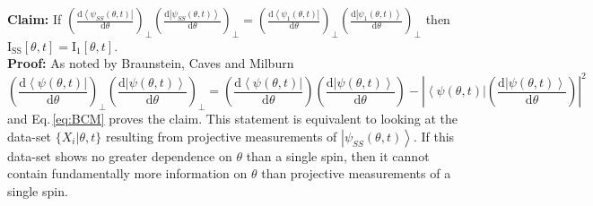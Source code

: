 \documentclass[reqno]{amsart}
\newcommand{\ket}[1]{\left| #1 \right>}
\newcommand{\bra}[1]{\left< #1 \right|}
\def\funcwrt#1#2#3{\mathrm{#1}_{\mathrm{#3}}\left[#2\right]}
\begin{document}
\textbf{Claim:} If $\left(\frac{\mathrm{d}\bra{\psi_{SS}(\theta,t)}}{\mathrm{d} \theta}\right)_{\perp}\left(\frac{\mathrm{d}\ket{\psi_{SS}(\theta,t)}}{\mathrm{d} \theta}\right)_{\perp} = \left(\frac{\mathrm{d}\bra{\psi_1(\theta,t)}}{\mathrm{d} \theta}\right)_{\perp}\left(\frac{\mathrm{d}\ket{\psi_1(\theta,t)}}{\mathrm{d} \theta}\right)_{\perp}$ then $\funcwrt{I}{\theta,t}{SS} = \funcwrt{I}{\theta,t}{1}$.\\

\textbf{Proof:} As noted by Braunstein, Caves and Milburn \cite{Braunstein1996}
\[ \left(\frac{\mathrm{d}\bra{\psi(\theta,t)}}{\mathrm{d} \theta}\right)_{\perp}\left(\frac{\mathrm{d}\ket{\psi(\theta,t)}}{\mathrm{d} \theta}\right)_{\perp} = \left(\frac{\mathrm{d}\bra{\psi(\theta,t)}}{\mathrm{d} \theta}\right)\left(\frac{\mathrm{d}\ket{\psi(\theta,t)}}{\mathrm{d} \theta}\right) - \left|\bra{\psi(\theta,t)}\left(\frac{\mathrm{d}\ket{\psi(\theta,t)}}{\mathrm{d} \theta}\right)\right|^2 \]
and Eq.\,\eqref{eq:BCM} proves the claim. This statement is equivalent to looking at the data-set $\{X_i|\theta,t\}$ resulting from projective measurements of $\ket{\psi_{SS}(\theta,t)}$. If this data-set shows no greater dependence on $\theta$ than a single spin, then it cannot contain fundamentally more information on $\theta$ than projective measurements of a single spin.\\

\end{document}
